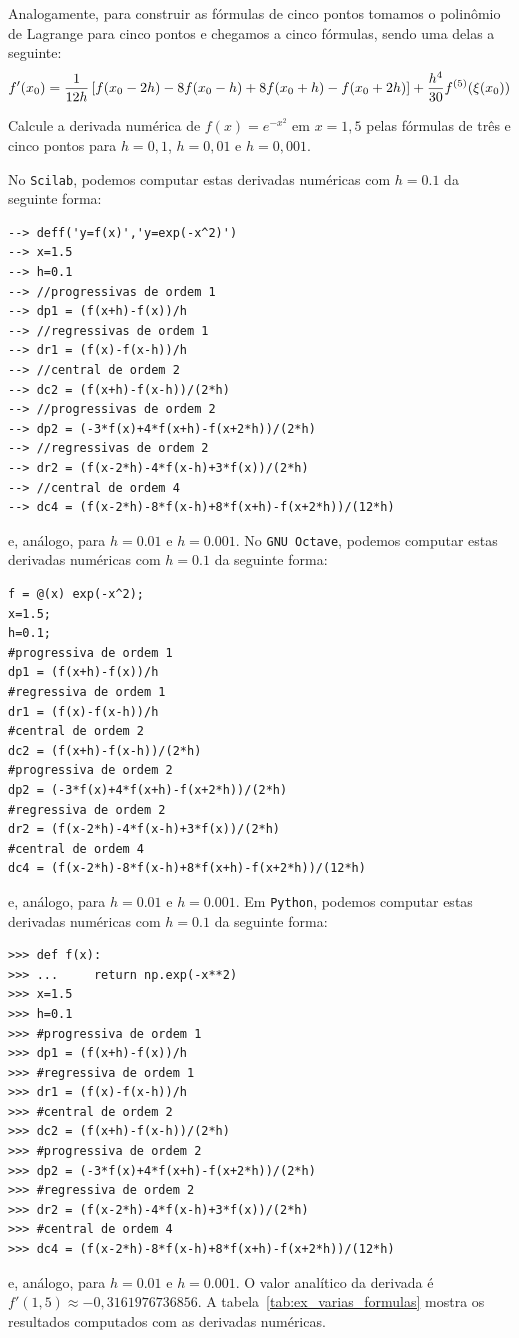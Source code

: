 Analogamente, para construir as fórmulas de cinco pontos tomamos o polinômio de Lagrange para cinco pontos e chegamos a cinco fórmulas, sendo uma delas a seguinte:
\begin{equation}
{\label{cinco_pontos}}f'(x_0)=\frac{1}{12h}\left[f(x_0-2h)-8f(x_0-h)+8f(x_0+h)-f(x_0+2h)\right]+\frac{h^4}{30}f^{(5)}(\xi(x_0))
\end{equation}

\begin{ex}\label{ex:varias_formulas}
Calcule a derivada numérica de $f(x)=e^{-x^2}$ em $x=1,5$ pelas fórmulas de três e cinco pontos para $h=0,1$, $h=0,01$ e $h=0,001$.
\end{ex}
\begin{sol}
\ifisscilab
No \verb+Scilab+, podemos computar estas derivadas numéricas com $h=0.1$ da seguinte forma:
\begin{verbatim}
--> deff('y=f(x)','y=exp(-x^2)')
--> x=1.5
--> h=0.1
--> //progressivas de ordem 1
--> dp1 = (f(x+h)-f(x))/h
--> //regressivas de ordem 1
--> dr1 = (f(x)-f(x-h))/h
--> //central de ordem 2
--> dc2 = (f(x+h)-f(x-h))/(2*h)
--> //progressivas de ordem 2
--> dp2 = (-3*f(x)+4*f(x+h)-f(x+2*h))/(2*h)
--> //regressivas de ordem 2
--> dr2 = (f(x-2*h)-4*f(x-h)+3*f(x))/(2*h)
--> //central de ordem 4
--> dc4 = (f(x-2*h)-8*f(x-h)+8*f(x+h)-f(x+2*h))/(12*h)
\end{verbatim}
e, análogo, para $h=0.01$ e $h=0.001$.
\fi
\ifisoctave
No \verb+GNU Octave+, podemos computar estas derivadas numéricas com $h=0.1$ da seguinte forma:
\begin{verbatim}
f = @(x) exp(-x^2);
x=1.5;
h=0.1;
#progressiva de ordem 1
dp1 = (f(x+h)-f(x))/h
#regressiva de ordem 1
dr1 = (f(x)-f(x-h))/h
#central de ordem 2
dc2 = (f(x+h)-f(x-h))/(2*h)
#progressiva de ordem 2
dp2 = (-3*f(x)+4*f(x+h)-f(x+2*h))/(2*h)
#regressiva de ordem 2
dr2 = (f(x-2*h)-4*f(x-h)+3*f(x))/(2*h)
#central de ordem 4
dc4 = (f(x-2*h)-8*f(x-h)+8*f(x+h)-f(x+2*h))/(12*h)
\end{verbatim}
e, análogo, para $h=0.01$ e $h=0.001$.
\fi
\ifispython
Em \verb+Python+, podemos computar estas derivadas numéricas com $h=0.1$ da seguinte forma:
\begin{verbatim}
>>> def f(x):
>>> ...     return np.exp(-x**2)
>>> x=1.5
>>> h=0.1
>>> #progressiva de ordem 1
>>> dp1 = (f(x+h)-f(x))/h
>>> #regressiva de ordem 1
>>> dr1 = (f(x)-f(x-h))/h
>>> #central de ordem 2
>>> dc2 = (f(x+h)-f(x-h))/(2*h)
>>> #progressiva de ordem 2
>>> dp2 = (-3*f(x)+4*f(x+h)-f(x+2*h))/(2*h)
>>> #regressiva de ordem 2
>>> dr2 = (f(x-2*h)-4*f(x-h)+3*f(x))/(2*h)
>>> #central de ordem 4
>>> dc4 = (f(x-2*h)-8*f(x-h)+8*f(x+h)-f(x+2*h))/(12*h)
\end{verbatim}
e, análogo, para $h=0.01$ e $h=0.001$.
\fi
O valor analítico da derivada é $f'(1,5) \approx -0,3161976736856$. A tabela~\ref{tab:ex_varias_formulas} mostra os resultados computados com as derivadas numéricas.


\end{sol}

